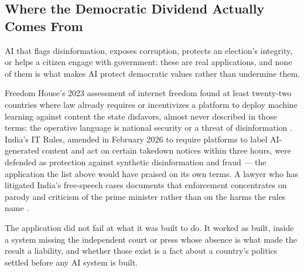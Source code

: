 \subsection{Where the Democratic Dividend Actually Comes From}
\label{sec:democratic-dividend}
AI that flags disinformation, exposes corruption, protects an election's integrity, or helps a citizen engage with government: these are real applications, and none of them is what makes AI protect democratic values rather than undermine them.

Freedom House's 2023 assessment of internet freedom found at least twenty-two countries where law already requires or incentivizes a platform to deploy machine learning against content the state disfavors, almost never described in those terms: the operative language is national security or a threat of disinformation \autocite{funk2023freedom}. India's IT Rules, amended in February 2026 to require platforms to label AI-generated content and act on certain takedown notices within three hours, were defended as protection against synthetic disinformation and fraud — the application the list above would have praised on its own terms. A lawyer who has litigated India's free-speech cases documents that enforcement concentrates on parody and criticism of the prime minister rather than on the harms the rules name \autocite{gupta2026three}.

The application did not fail at what it was built to do. It worked as built, inside a system missing the independent court or press whose absence is what made the result a liability, and whether those exist is a fact about a country's politics settled before any AI system is built.

